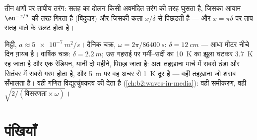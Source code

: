\begin{omfigure}

{\small तीन क्षणों पर तापीय तरंग: सतह का दोलन
किसी अवमंदित तरंग की तरह घुसता है, जिसका आयाम $\eu^{-x/\delta}$ की तरह गिरता है
(बिंदुदार) और जिसकी कला $x/\delta$ से पिछड़ती है --- और $x = \pi\delta$ पर
ताप सतह वाले के उलट होता है।}
\end{omfigure}

\begin{example}[मिट्टी, तहख़ाना और शराब]\label{ex:b2:heat-conduction:soil}
मिट्टी, $a \approx \qty{5e-7}{m^2/s}$। दैनिक चक्र, $\omega = 2\pi/\qty{86400}{s}$:
$\delta = \qty{12}{cm}$ --- आधा मीटर नीचे दिन ग़ायब है। वार्षिक चक्र:
$\delta = \qty{2.2}{m}$; उस गहराई पर गर्मी--सर्दी का \qty{10}{K} का झूला
घटकर \qty{3.7}{K} रह जाता है और एक रेडियन, यानी दो महीने, पिछड़ जाता है: अतः तहख़ाना
मार्च में सबसे ठंडा और सितंबर में सबसे गरम होता है, और \qty{5}{m} पर वह
अचर से \qty{1}{K} दूर है --- वही तहख़ाना जो शराब सँभालता है। वही
गणित विद्युत्चुंबकत्व की  देता है
(\cref{ch:b2:waves-in-media}): वही समीकरण, वही $\sqrt{2/(\text{विसरणता}
\times\omega)}$।
\end{example}

\section{पंखियाँ}


